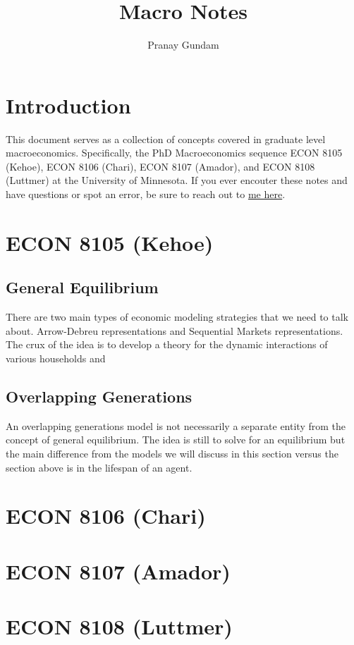 \documentclass[11pt,english]{article}
\title{\textbf{Macro Notes}}
\author{Pranay Gundam}
\begin{document}
\maketitle

\tableofcontents

\section{Introduction}

This document serves as a collection of concepts covered in graduate level macroeconomics. Specifically, the PhD Macroeconomics sequence ECON 8105 (Kehoe), ECON 8106 (Chari), ECON 8107 (Amador), and ECON 8108 (Luttmer) at the University of Minnesota. If you ever encouter these notes and have questions or spot an error, be sure to reach out to \href{mailto:pranaygundam00@gmail.com}{me here}.

\section{ECON 8105 (Kehoe)}

\subsection{General Equilibrium}

There are two main types of economic modeling strategies that we need to talk about. Arrow-Debreu representations and Sequential Markets representations. The crux of the idea is to develop a theory for the dynamic interactions of various households and 

\subsection{Overlapping Generations}

An overlapping generations model is not necessarily a separate entity from the concept of general equilibrium. The idea is still to solve for an equilibrium but the main difference from the models we will discuss in this section versus the section above is in the lifespan of an agent. 

\section{ECON 8106 (Chari)}

\section{ECON 8107 (Amador)}

\section{ECON 8108 (Luttmer)}
\end{document}
